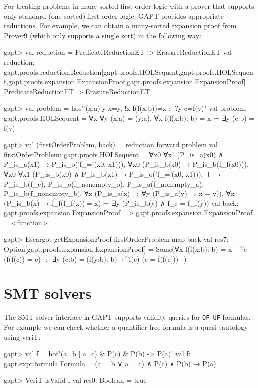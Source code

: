 \documentclass[a4paper,11pt]{book}
\begin{document}
For treating problems in many-sorted first-order logic with a prover that supports only
standard (one-sorted) first-order logic, GAPT provides appropriate reductions.
For example, we can obtain a many-sorted expansion proof from Prover9
(which only supports a single sort) in the following way:
\begin{clilisting}
gapt> val reduction = PredicateReductionET |> ErasureReductionET
val reduction: gapt.proofs.reduction.Reduction[gapt.proofs.HOLSequent,gapt.proofs.HOLSequent,gapt.proofs.expansion.ExpansionProof,gapt.proofs.expansion.ExpansionProof] = PredicateReductionET |> ErasureReductionET

gapt> val problem = hos"!(x:a)!y x=y, !x f(f(x:b))=x :- ?y c=f(y)"
val problem: gapt.proofs.HOLSequent = ∀x ∀y (x:a) = (y:a), ∀x f(f(x:b): b) = x ⊢ ∃y (c:b) = f(y)

gapt> val (firstOrderProblem, back) = reduction forward problem
val firstOrderProblem: gapt.proofs.HOLSequent =
∀x0 ∀x1 (P_is_a(x0) ∧ P_is_a(x1) → P_is_o('f_='(x0, x1))),
∀x0 (P_is_b(x0) → P_is_b(f_f(x0))),
∀x0 ∀x1 (P_is_b(x0) ∧ P_is_b(x1) → P_is_o('f_='(x0, x1))),
⊤ → P_is_b(f_c),
P_is_o(f_nonempty_o),
P_is_a(f_nonempty_a),
P_is_b(f_nonempty_b),
∀x (P_is_a(x) → ∀y (P_is_a(y) → x = y)),
∀x (P_is_b(x) → f_f(f_f(x)) = x)
⊢
∃y (P_is_b(y) ∧ f_c = f_f(y))
val back: gapt.proofs.expansion.ExpansionProof => gapt.proofs.expansion.ExpansionProof = <function>

gapt> Escargot getExpansionProof firstOrderProblem map back
val res7: Option[gapt.proofs.expansion.ExpansionProof] =
Some(∀x f(f(x:b): b) = x +^{c} (f(f(c)) = c)-
:-
∃y (c:b) = (f(y:b): b) +^{f(c)} (c = f(f(c)))+)

\end{clilisting}

\section{SMT solvers}

The SMT solver interface in GAPT supports validity queries for \verb,QF_UF,
formulas.  For example we can check whether a quantifier-free formula is a
quasi-tautology using veriT:
\begin{clilisting}
gapt> val f = hof"(a=b | a=c) & P(c) & P(b) -> P(a)"
val f: gapt.expr.formula.Formula = (a = b ∨ a = c) ∧ P(c) ∧ P(b) → P(a)

\end{clilisting}

\begin{clilisting}
gapt> VeriT isValid f
val res0: Boolean = true

\end{clilisting}
\end{document}
